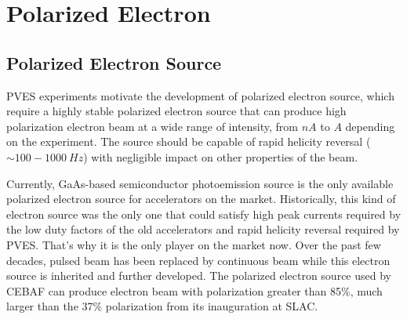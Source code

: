\section{Polarized Electron}

\subsection{Polarized Electron Source}
PVES experiments motivate the development of polarized electron source, which 
require a highly stable polarized electron source that can produce
high polarization electron beam at a wide range of intensity, from $nA$ to $A$ 
depending on the experiment. The source should be capable of rapid helicity
reversal ($\sim 100-1000 \ Hz$) with negligible impact on other properties of the beam.

Currently, GaAs-based semiconductor photoemission source is %
the only available polarized electron source for accelerators on the market.
Historically, this 
kind of electron source was the only one that could satisfy high peak currents 
required by the low duty factors of the old accelerators and rapid helicity 
reversal required by PVES. That's why it is the only player on the market now.
Over the past few decades, pulsed beam has been replaced by continuous beam while
this electron source is inherited and further developed. The polarized electron
source used by CEBAF can produce electron beam with polarization greater than
85\%, much larger than the 37\% polarization from its inauguration at SLAC. \cite{PRESCOTT1978347}

